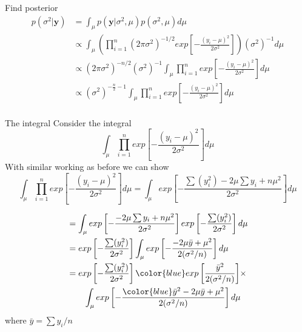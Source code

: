 \documentclass[10pt]{beamer}
\begin{document}
\begin{frame}{Find posterior}
  \begin{align*}
    p(\sigma^2|{\bm y})&=\int_{\mu}p({\bm y}|\sigma^2,\mu)p(\sigma^2,\mu)d\mu\\
                       &\propto \int_{\mu}\left(\prod_{i=1}^n (2\pi\sigma^2)^{-1/2}
                         exp\left[-\frac{(y_i-\mu)^2}{2\sigma^2}\right]\right)(\sigma^{2})^{-1}d\mu\\
                       &\propto (2\pi\sigma^2)^{-n/2}(\sigma^{2})^{-1}\int_{\mu}\prod_{i=1}^n
                         exp\left[-\frac{(y_i-\mu)^2}{2\sigma^2}\right]d\mu\\
                       &\propto (\sigma^2)^{-\frac{n}{2}-1}\int_{\mu}\prod_{i=1}^n
                         exp\left[-\frac{(y_i-\mu)^2}{2\sigma^2}\right]d\mu\\
  \end{align*}
\end{frame}
\begin{frame}{The integral}
  Consider the integral
  \begin{equation}
    \int_{\mu}\prod_{i=1}^n
    exp\left[-\frac{(y_i-\mu)^2}{2\sigma^2}\right]d\mu
  \end{equation}
  With similar working as before we can show
  \begin{equation*}
    \int_{\mu}\prod_{i=1}^n
    exp\left[-\frac{(y_i-\mu)^2}{2\sigma^2}\right]d\mu=
    \int_{\mu}exp\left[-\frac{\sum(y_i^2)-2\mu\sum y_i+n\mu^2}{2\sigma^2}\right]d\mu
  \end{equation*}
\end{frame}
\begin{frame}
  \begin{align*}
    &=\int_{\mu}exp\left[-\frac{-2\mu\sum y_i+n\mu^2}{2\sigma^2}\right]
      exp\left[-\frac{\sum(y_i^2)}{2\sigma^2}\right]d\mu\\
    &=exp\left[-\frac{\sum(y_i^2)}{2\sigma^2}\right]\int_{\mu}exp\left[-\frac{-2\mu\bar{y}+\mu^2}{2(\sigma^2/n)}\right]
      d\mu\\
    &=exp\left[-\frac{\sum(y_i^2)}{2\sigma^2}\right]
      {\color{blue} exp\left[\frac{\bar{y}^2}{2(\sigma^2/n)}\right]}\times\\
    &\quad\quad
      \int_{\mu}exp\left[-\frac{{\color{blue}\bar{y}^2}-2\mu\bar{y}+\mu^2}{2(\sigma^2/n)}\right]
      d\mu\\
  \end{align*}
  where $\bar{y}=\sum y_i/n$
\end{frame}
\end{document}
